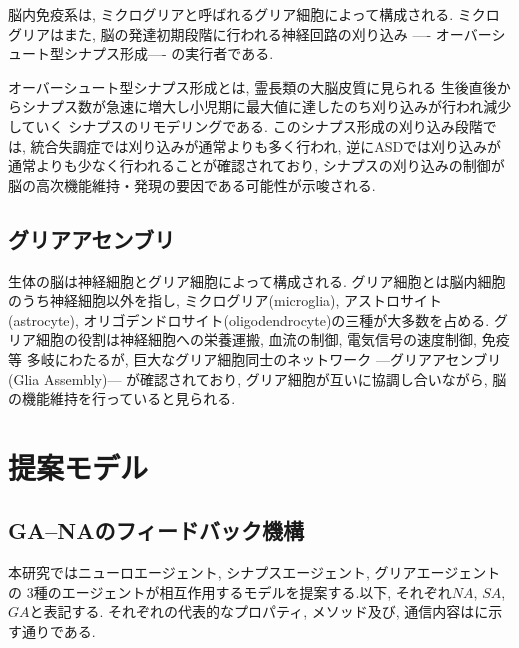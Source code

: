 \documentclass[a4paper,10.5pt,twocolumn]{jsarticle}
\begin{document}
脳内免疫系は, ミクログリアと呼ばれるグリア細胞によって構成される.
ミクログリアはまた, 
脳の発達初期段階に行われる神経回路の刈り込み ----
オーバーシュート型シナプス形成---- の実行者である.

オーバーシュート型シナプス形成とは, 霊長類の大脳皮質に見られる
生後直後からシナプス数が急速に増大し小児期に最大値に達したのち刈り込みが行われ減少していく
シナプスのリモデリングである.
このシナプス形成の刈り込み段階では, 統合失調症では刈り込みが通常よりも多く行われ, 
逆にASDでは刈り込みが通常よりも少なく行われることが確認されており, 
シナプスの刈り込みの制御が脳の高次機能維持・発現の要因である可能性が示唆される.
\subsection{グリアアセンブリ}
\label{sec:g-asem}
生体の脳は神経細胞とグリア細胞によって構成される.
グリア細胞とは脳内細胞のうち神経細胞以外を指し, 
ミクログリア(microglia), アストロサイト(astrocyte),
オリゴデンドロサイト(oligodendrocyte)の三種が大多数を占める.
グリア細胞の役割は神経細胞への栄養運搬, 血流の制御, 電気信号の速度制御, 免疫等
多岐にわたるが, 
巨大なグリア細胞同士のネットワーク 
---グリアアセンブリ(Glia Assembly)--- 
が確認されており, グリア細胞が互いに協調し合いながら, 
脳の機能維持を行っていると見られる.
\section{提案モデル}
\subsection{GA--NAのフィードバック機構}
本研究ではニューロエージェント, シナプスエージェント, グリアエージェントの
3種のエージェントが相互作用するモデルを提案する.以下, それぞれ$NA$, $SA$, $GA$と表記する.
それぞれの代表的なプロパティ, メソッド及び, 通信内容はに示す通りである.
\end{document}
